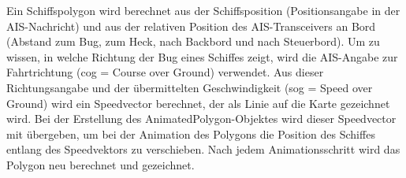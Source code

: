 Ein Schiffspolygon wird berechnet aus der Schiffsposition (Positionsangabe in der AIS-Nachricht) und aus der relativen Position des AIS-Transceivers an Bord (Abstand zum Bug, zum Heck, nach Backbord und nach Steuerbord). Um zu wissen, in welche Richtung der Bug eines Schiffes zeigt, wird die AIS-Angabe zur Fahrtrichtung (cog = Course over Ground) verwendet. Aus dieser Richtungsangabe und der übermittelten Geschwindigkeit (sog = Speed over Ground) wird ein Speedvector berechnet, der als Linie auf die Karte gezeichnet wird. Bei der Erstellung des AnimatedPolygon-Objektes wird dieser Speedvector mit übergeben, um bei der Animation des Polygons die Position des Schiffes entlang des Speedvektors zu verschieben. Nach jedem Animationsschritt wird das Polygon neu berechnet und gezeichnet.


